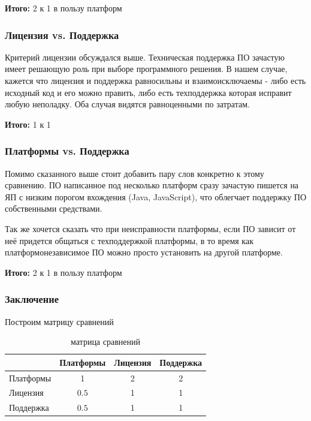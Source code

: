 \documentclass[a4paper,12pt]{report} %
\begin{document}
\textbf{Итого:} 2 к 1 в пользу платформ
\subsubsection{Лицензия vs. Поддержка}

Критерий лицензии обсуждался выше. Техническая поддержка ПО зачастую имеет
решающую роль при выборе программного решения. В нашем случае, кажется что
лицензия и поддержка равносильны и взаимоисключаемы - либо есть исходный код и
его можно править, либо есть техподдержка которая исправит любую неполадку. Оба
случая видятся равноценными по затратам.

\textbf{Итого:} 1 к 1
\subsubsection{Платформы vs. Поддержка}

Помимо сказанного выше стоит добавить пару слов конкретно к этому сравнению. ПО
написанное под несколько платформ сразу зачастую пишется на ЯП с низким порогом
вхождения (Java, JavaScript), что облегчает поддержку ПО собственными
средствами.

Так же хочется сказать что при неисправности платформы, если ПО зависит от неё
придется общаться с техподдержкой платформы, в то время как платформонезависимое
ПО можно просто установить на другой платформе.

\textbf{Итого:} 2 к 1 в пользу платформ

\subsubsection{Заключение}

Построим матрицу сравнений
\begin{table}[h]
  \caption{матрица сравнений}
  \begin{tabular}{l|c|c|c|}
    \cline{2-4}
    {}                              & \multicolumn{1}{l|}{Платформы} & \multicolumn{1}{l|}{Лицензия} & \multicolumn{1}{l|}{Поддержка} \\ \hline
    \multicolumn{1}{|l|}{Платформы} & 1                              & 2                             & 2                              \\ \hline
    \multicolumn{1}{|l|}{Лицензия}  & $0.5$                          & 1                             & 1                              \\ \hline
    \multicolumn{1}{|l|}{Поддержка} & $0.5$                          & 1                             & 1                              \\ \hline
  \end{tabular}
\end{table}
\end{document}
